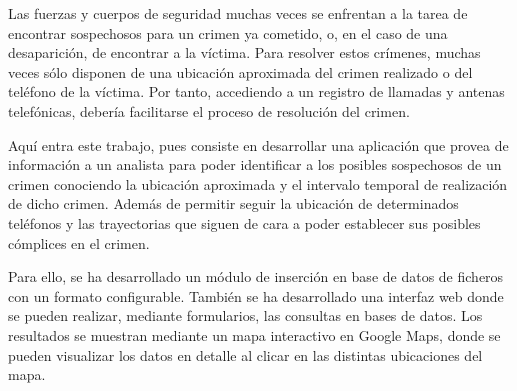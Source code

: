 Las fuerzas y cuerpos de seguridad muchas veces se enfrentan a la tarea de encontrar sospechosos para un crimen ya cometido, o, en el caso de una desaparición, de encontrar a la víctima. 
Para resolver estos crímenes, muchas veces sólo disponen de una ubicación aproximada del crimen realizado o del teléfono de la víctima. 
Por tanto, accediendo a un registro de llamadas y antenas telefónicas, debería facilitarse el proceso de resolución del crimen.

Aquí entra este trabajo, pues consiste en desarrollar una aplicación que provea de información a un analista para poder identificar a los posibles sospechosos de un crimen conociendo la ubicación aproximada y el intervalo temporal de realización de dicho crimen. 
Además de permitir seguir la ubicación de determinados teléfonos y las trayectorias que siguen de cara a poder establecer sus posibles cómplices en el crimen. 

Para ello, se ha desarrollado un módulo de inserción en base de datos de ficheros con un formato configurable. 
También se ha desarrollado una interfaz web donde se pueden realizar, mediante formularios, las consultas en bases de datos. 
Los resultados se muestran mediante un mapa interactivo en Google Maps, donde se pueden visualizar los datos en detalle al clicar en las distintas ubicaciones del mapa.


